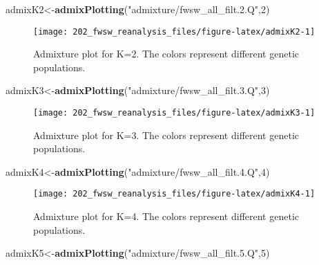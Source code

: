 \documentclass[11pt,]{article}
\newenvironment{Shaded}{\begin{snugshade}}{\end{snugshade}}
\newcommand{\KeywordTok}[1]{\textcolor[rgb]{0.13,0.29,0.53}{\textbf{#1}}}
\newcommand{\DecValTok}[1]{\textcolor[rgb]{0.00,0.00,0.81}{#1}}
\newcommand{\StringTok}[1]{\textcolor[rgb]{0.31,0.60,0.02}{#1}}
\newcommand{\NormalTok}[1]{#1}
\begin{document}
\begin{Shaded}
\begin{Highlighting}[]
\NormalTok{admixK2<-}\KeywordTok{admixPlotting}\NormalTok{(}\StringTok{"admixture/fwsw_all_filt.2.Q"}\NormalTok{,}\DecValTok{2}\NormalTok{)}
\end{Highlighting}
\end{Shaded}

\begin{figure}[H]
\texttt{[image: 202\_fwsw\_reanalysis\_files/figure-latex/admixK2-1]} \caption{Admixture plot for K=2. The colors represent different genetic populations.}\label{fig:admixK2}
\end{figure}

\begin{Shaded}
\begin{Highlighting}[]
\NormalTok{admixK3<-}\KeywordTok{admixPlotting}\NormalTok{(}\StringTok{"admixture/fwsw_all_filt.3.Q"}\NormalTok{,}\DecValTok{3}\NormalTok{)}
\end{Highlighting}
\end{Shaded}

\begin{figure}[H]
\texttt{[image: 202\_fwsw\_reanalysis\_files/figure-latex/admixK3-1]} \caption{Admixture plot for K=3. The colors represent different genetic populations.}\label{fig:admixK3}
\end{figure}

\begin{Shaded}
\begin{Highlighting}[]
\NormalTok{admixK4<-}\KeywordTok{admixPlotting}\NormalTok{(}\StringTok{"admixture/fwsw_all_filt.4.Q"}\NormalTok{,}\DecValTok{4}\NormalTok{)}
\end{Highlighting}
\end{Shaded}

\begin{figure}[H]
\texttt{[image: 202\_fwsw\_reanalysis\_files/figure-latex/admixK4-1]} \caption{Admixture plot for K=4. The colors represent different genetic populations.}\label{fig:admixK4}
\end{figure}

\begin{Shaded}
\begin{Highlighting}[]
\NormalTok{admixK5<-}\KeywordTok{admixPlotting}\NormalTok{(}\StringTok{"admixture/fwsw_all_filt.5.Q"}\NormalTok{,}\DecValTok{5}\NormalTok{)}
\end{Highlighting}
\end{Shaded}
\end{document}
